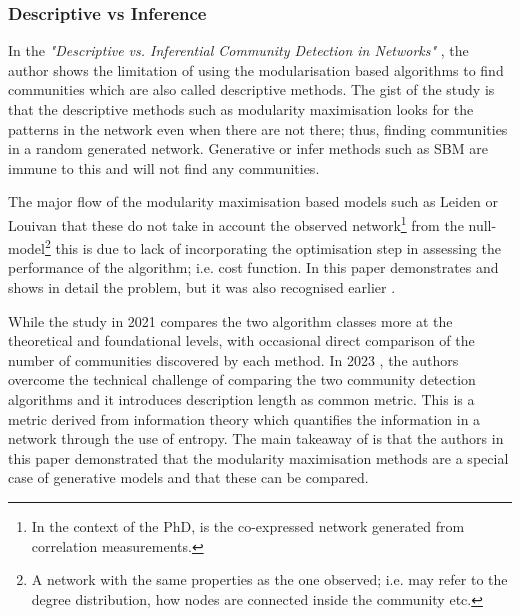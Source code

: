 \subsubsection{Descriptive vs Inference} \label{s:lit:descriptive_inference}

In the \textit{"Descriptive vs. Inferential Community Detection in Networks"} \citet{Peixoto2021-jx}, the author shows the limitation of using the modularisation based algorithms to find communities which are also called descriptive methods. The gist of the study is that the descriptive methods such as modularity maximisation looks for the patterns in the network even when there are not there; thus, finding communities in a random generated network. Generative or infer methods such as SBM are immune to this and will not find any communities. 

The major flow of the modularity maximisation based models such as Leiden or Louivan that these do not take in account the observed network\footnote{In the context of the PhD, is the co-expressed network generated from correlation measurements.} from the null-model\footnote{A network with the same properties as the one observed; i.e. may refer to the degree distribution, how nodes are connected inside the community etc.} this is due to lack of incorporating the optimisation step in assessing the performance of the algorithm; i.e. cost function. In this paper \citet{Peixoto2021-jx} demonstrates and shows in detail the problem, but it was also recognised earlier \citet{Guimera2004-gv}.

While the study in 2021 \citet{Peixoto2021-jx} compares the two algorithm classes more at the theoretical and foundational levels, with occasional direct comparison of the number of communities discovered by each method. In 2023 \citet{Peixoto2023-rt}, the authors overcome the technical challenge of comparing the two community detection algorithms and it introduces description length as common metric. This is a metric derived from information theory which quantifies the information in a network through the use of entropy. The main takeaway of \citet{Peixoto2023-rt} is that the authors in this paper demonstrated that the modularity maximisation methods are a special case of generative models and that these can be compared.


